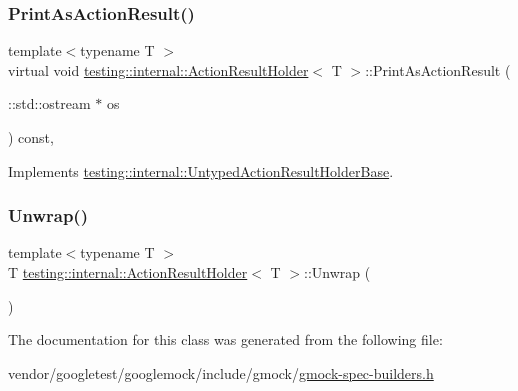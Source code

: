 \mbox{\label{classtesting_1_1internal_1_1_action_result_holder_a06d1fb40fc863328dbcc102bc46dece4}} 
\subsubsection{\texorpdfstring{Print\+As\+Action\+Result()}{PrintAsActionResult()}}
{\footnotesize\ttfamily template$<$typename T $>$ \\
virtual void \hyperlink{classtesting_1_1internal_1_1_action_result_holder}{testing\+::internal\+::\+Action\+Result\+Holder}$<$ T $>$\+::Print\+As\+Action\+Result (\begin{DoxyParamCaption}\item[{\+::std\+::ostream $\ast$}]{os }\end{DoxyParamCaption}) const\hspace{0.3cm}{\ttfamily [inline]}, {\ttfamily [virtual]}}



Implements \hyperlink{classtesting_1_1internal_1_1_untyped_action_result_holder_base_a4b4a558fcb1d3b02c0fec34f186d3b90}{testing\+::internal\+::\+Untyped\+Action\+Result\+Holder\+Base}.

\mbox{\label{classtesting_1_1internal_1_1_action_result_holder_a057df6cceeeab9ea06e679bcf6b78960}} 
\subsubsection{\texorpdfstring{Unwrap()}{Unwrap()}}
{\footnotesize\ttfamily template$<$typename T $>$ \\
T \hyperlink{classtesting_1_1internal_1_1_action_result_holder}{testing\+::internal\+::\+Action\+Result\+Holder}$<$ T $>$\+::Unwrap (\begin{DoxyParamCaption}{ }\end{DoxyParamCaption})\hspace{0.3cm}{\ttfamily [inline]}}



The documentation for this class was generated from the following file\+:\begin{DoxyCompactItemize}
\item 
vendor/googletest/googlemock/include/gmock/\hyperlink{gmock-spec-builders_8h}{gmock-\/spec-\/builders.\+h}\end{DoxyCompactItemize}
